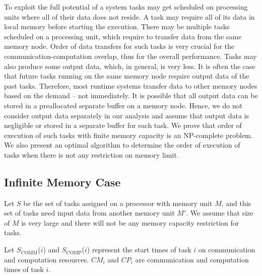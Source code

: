 \documentclass[sigconf]{acmart}
\newcommand{\scomm}{\ensuremath{{S}_{\text{COMM}}}}
\newcommand{\scomp}{\ensuremath{{S}_{\text{COMP}}}}
\begin{document}
	To exploit the full potential of a system tasks may get scheduled on processing
	units where all of their data does not reside. A task may require all of its data
	in local memory before starting the execution. There may be multiple tasks
	scheduled on a processing unit, which require to transfer data from the same
	memory node. Order of data transfers for such tasks is very crucial for the
	communication-computation overlap, thus for the overall performance. Tasks may
	also produce some output data, which, in general, is very less.  It is often the case that future tasks running on the same memory node require output data of the past tasks. Therefore, most runtime systems transfer data to other memory nodes based on the demand -- not immediately. It is possible that all output data can be stored in a preallocated separate buffer on a memory node. Hence, we do not consider output data separately in our analysis and assume that output data is negligible  or stored in a separate buffer for each task. We prove that order of execution of such tasks with finite memory capacity is an NP-complete problem. We also present an optimal algorithm to determine the order of execution of tasks when there is not any  restriction on memory limit.
	
	
	\subsection{Infinite Memory Case}
	Let $S$ be the set of tasks assigned on a processor with memory unit $M$, and this set of tasks  need input data from another memory unit $M'$. We assume that size of $M$ is very large and there will not be any memory capacity restriction for tasks.
	
	Let \scomm($i$) and  \scomp($i$) represent the start times of task $i$ on communication and computation resources. $CM_i$ and $CP_i$ are communication and computation times of task $i$.
	
\end{document}
